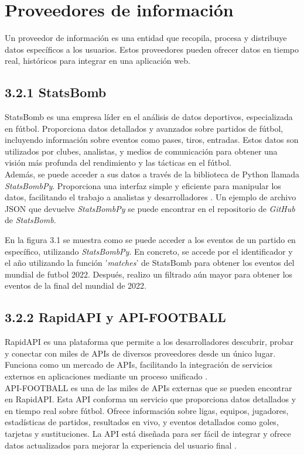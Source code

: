\section{Proveedores de información}
Un proveedor de información es una entidad que recopila, procesa y distribuye datos específicos a los usuarios. Estos proveedores pueden ofrecer datos en tiempo real, históricos para integrar en una aplicación web. \\
\subsection{3.2.1 StatsBomb}
StatsBomb es una empresa líder en el análisis de datos deportivos, especializada en fútbol. Proporciona datos detallados y avanzados sobre partidos de fútbol, incluyendo información sobre eventos como pases, tiros, entradas. Estos datos son utilizados por clubes, analistas, y medios de comunicación para obtener una visión más profunda del rendimiento y las tácticas en el fútbol. \\
Además, se puede acceder a sus datos a través de la biblioteca de Python llamada \textit{StatsBombPy}. Proporciona una interfaz simple y eficiente para manipular los datos, facilitando el trabajo a analistas y desarrolladores \cite{StatsBomb}.
Un ejemplo de archivo JSON que devuelve \textit{StatsBombPy} se puede encontrar en el repositorio de \textit{GitHub} de \textit{StatsBomb}.

En la figura 3.1 se muestra como se puede acceder a los eventos de un partido en específico, utilizando \textit{StatsBombPy}. En concreto, se accede por el identificador y el año utilizando la función '\textit{matches}' de StatsBomb para obtener los eventos del mundial de futbol 2022. Después, realizo un filtrado aún mayor para obtener los eventos de la final del mundial de 2022.

\subsection{3.2.2 RapidAPI y API-FOOTBALL}
RapidAPI es una plataforma que permite a los desarrolladores descubrir, probar y conectar con miles de APIs de diversos proveedores desde un único lugar. Funciona como un mercado de APIs, facilitando la integración de servicios externos en aplicaciones mediante un proceso unificado \cite{rapidapi}. \\
API-FOOTBALL es una de las miles de APIs externas que se pueden encontrar en RapidAPI. Esta API conforma un servicio que proporciona datos detallados y en tiempo real sobre fútbol. Ofrece información sobre ligas, equipos, jugadores, estadísticas de partidos, resultados en vivo, y eventos detallados como goles, tarjetas y sustituciones. La API está diseñada para ser fácil de integrar y ofrece datos actualizados para mejorar la experiencia del usuario final \cite{api:web}.

